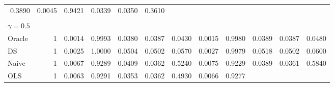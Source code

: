 \begin{tabular}{llllllllllll}
  \multicolumn{1}{r}{0.3890} &
  \multicolumn{1}{r}{0.0045} &
  \multicolumn{1}{r}{0.9421} &
  \multicolumn{1}{r}{0.0339} &
  \multicolumn{1}{r}{0.0350} &
  \multicolumn{1}{r}{0.3610} \\
\multicolumn{1}{l}{} &
  \multicolumn{1}{|r}{} &
  \multicolumn{1}{r}{} &
  \multicolumn{1}{r}{} &
  \multicolumn{1}{r}{} &
  \multicolumn{1}{r}{} &
  \multicolumn{1}{r}{} &
  \multicolumn{1}{r}{} &
  \multicolumn{1}{r}{} &
  \multicolumn{1}{r}{} &
  \multicolumn{1}{r}{} &
  \multicolumn{1}{r}{} \\
\multicolumn{1}{l}{$\gamma = 0.5$} &
  \multicolumn{1}{|r}{} &
  \multicolumn{1}{r}{} &
  \multicolumn{1}{r}{} &
  \multicolumn{1}{r}{} &
  \multicolumn{1}{r}{} &
  \multicolumn{1}{r}{} &
  \multicolumn{1}{r}{} &
  \multicolumn{1}{r}{} &
  \multicolumn{1}{r}{} &
  \multicolumn{1}{r}{} &
  \multicolumn{1}{r}{} \\
\multicolumn{1}{l}{\hspace{1em}Oracle} &
  \multicolumn{1}{|r}{1} &
  \multicolumn{1}{r}{0.0014} &
  \multicolumn{1}{r}{0.9993} &
  \multicolumn{1}{r}{0.0380} &
  \multicolumn{1}{r}{0.0387} &
  \multicolumn{1}{r}{0.0430} &
  \multicolumn{1}{r}{0.0015} &
  \multicolumn{1}{r}{0.9980} &
  \multicolumn{1}{r}{0.0389} &
  \multicolumn{1}{r}{0.0387} &
  \multicolumn{1}{r}{0.0480} \\
\multicolumn{1}{l}{\hspace{1em}DS} &
  \multicolumn{1}{|r}{1} &
  \multicolumn{1}{r}{0.0025} &
  \multicolumn{1}{r}{1.0000} &
  \multicolumn{1}{r}{0.0504} &
  \multicolumn{1}{r}{0.0502} &
  \multicolumn{1}{r}{0.0570} &
  \multicolumn{1}{r}{0.0027} &
  \multicolumn{1}{r}{0.9979} &
  \multicolumn{1}{r}{0.0518} &
  \multicolumn{1}{r}{0.0502} &
  \multicolumn{1}{r}{0.0600} \\
\multicolumn{1}{l}{\hspace{1em}Naive} &
  \multicolumn{1}{|r}{1} &
  \multicolumn{1}{r}{0.0067} &
  \multicolumn{1}{r}{0.9289} &
  \multicolumn{1}{r}{0.0409} &
  \multicolumn{1}{r}{0.0362} &
  \multicolumn{1}{r}{0.5240} &
  \multicolumn{1}{r}{0.0075} &
  \multicolumn{1}{r}{0.9229} &
  \multicolumn{1}{r}{0.0389} &
  \multicolumn{1}{r}{0.0361} &
  \multicolumn{1}{r}{0.5840} \\
\multicolumn{1}{l}{\hspace{1em}OLS} &
  \multicolumn{1}{|r}{1} &
  \multicolumn{1}{r}{0.0063} &
  \multicolumn{1}{r}{0.9291} &
  \multicolumn{1}{r}{0.0353} &
  \multicolumn{1}{r}{0.0362} &
  \multicolumn{1}{r}{0.4930} &
  \multicolumn{1}{r}{0.0066} &
  \multicolumn{1}{r}{0.9277} &

\end{tabular}
